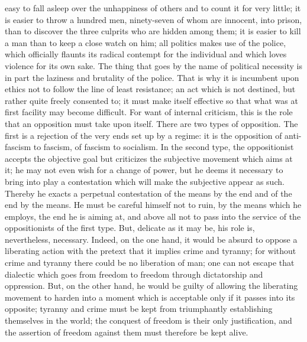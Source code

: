 \documentclass[11pt]{article}
\begin{document}
{{easy to fall asleep over the unhappiness of others and to count it for very little; it is easier to throw a hundred men, ninety-seven of whom are innocent, into prison, than to discover the three culprits who are hidden among them; it is easier to kill a man than to keep a close watch on him; all politics makes use of the police, which officially flaunts its radical contempt for the individual and which loves violence for its own sake. The thing that goes by the name of political necessity is in part the laziness and brutality of the police. That is why it is incumbent upon ethics not to follow the line of least resistance; an act which is not destined, but rather quite freely consented to; it must make itself effective so that what was at first facility may become difficult. For want of internal criticism, this is the role that an opposition must take upon itself. There are two types of opposition. The first is a rejection of the very ends set up by a regime: it is the opposition of anti-fascism to fascism, of fascism to socialism. In the second type, the oppositionist accepts the objective goal but criticizes the subjective movement which aims at it; he may not even wish for a change of power, but he deems it necessary to bring into play a contestation which will make the subjective appear as such. Thereby he exacts a perpetual contestation of the means by the end and of the end by the means. He must be careful himself not to ruin, by the means which he employs, the end he is aiming at, and above all not to pass into the service of the oppositionists of the first type. But, delicate as it may be, his role is, nevertheless, necessary. Indeed, on the one hand, it would be absurd to oppose a liberating action with the pretext that it implies crime and tyranny; for without crime and tyranny there could be no liberation of man; one can not escape that dialectic which goes from freedom to freedom through dictatorship and oppression. But, on the other hand, he would be guilty of allowing the liberating movement to harden into a moment which is acceptable only if it passes into its opposite; tyranny and crime must be kept from triumphantly establishing themselves in the world; the conquest of freedom is their only justification, and the assertion of freedom against them must therefore be kept alive.
\pagebreak

{}
}}
\end{document}

